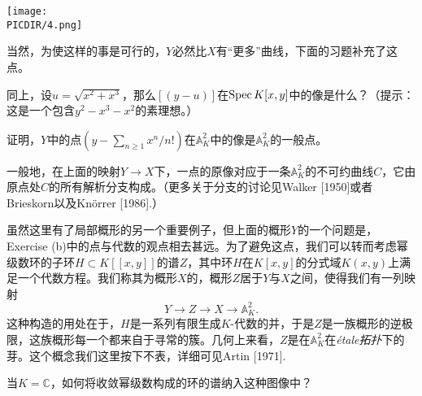 \begin{center}\texttt{[image: \\PICDIR/4.png]}\end{center}

当然，为使这样的事是可行的，$Y$必然比$X$有“更多”曲线，下面的习题补充了这点。

\begin{exe}
	\begin{compactenum}[(a)]
		\item 同上，设$u=\sqrt{x^2+x^3}$，那么$[(y-u)]$在$\operatorname{Spec} K[x,y]$中的像是什么？（提示：这是一个包含$y^2-x^3-x^2$的素理想。）
		\item 证明，$Y$中的点$(y-\sum_{n\geq 1}x^n/n!)$在$\mathbb{A}_K^2$中的像是$\mathbb{A}_K^2$的一般点。
	\end{compactenum}
\end{exe}

一般地，在上面的映射$Y\to X$下，一点的原像对应于一条$\mathbb{A}_K^2$的不可约曲线$C$，它由原点处$C$的所有解析分支构成。（更多关于分支的讨论见Walker [1950]或者Brieskorn以及Kn\"{o}rrer [1986].）

虽然这里有了局部概形的另一个重要例子，但上面的概形$Y$的一个问题是，Exercise {\theexe}(b)中的点与代数的观点相去甚远。为了避免这点，我们可以转而考虑幂级数环的子环$H\subset K[\![x,y]\!]$的谱$Z$，其中环$H$在$K[x,y]$的分式域$K(x,y)$上满足一个代数方程。我们称其为概形$X$的，概形$Z$居于$Y$与$X$之间，使得我们有一列映射
\[
	Y\to Z\to X\to \mathbb{A}_K^2.
\]
这种构造的用处在于，$H$是一系列有限生成$K$\hyp 代数的并，于是$Z$是一族概形的逆极限，这族概形每一个都来自于寻常的簇。几何上来看，$Z$是在$\mathbb{A}_K^2$在\textit{\'{e}tale拓扑}下的芽。这个概念我们这里按下不表，详细可见Artin [1971].

\begin{exe}
	当$K=\mathbb{C}$，如何将收敛幂级数构成的环的谱纳入这种图像中？
\end{exe}